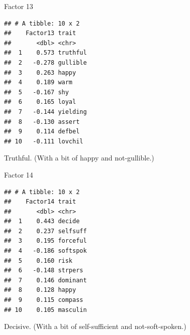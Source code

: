 \documentclass[
  ignorenonframetext,
]{beamer}
\newenvironment{Shaded}{\begin{snugshade}}{\end{snugshade}}
\newcommand{\DecValTok}[1]{\textcolor[rgb]{0.00,0.00,0.81}{#1}}
\newcommand{\KeywordTok}[1]{\textcolor[rgb]{0.13,0.29,0.53}{\textbf{#1}}}
\newcommand{\NormalTok}[1]{#1}
\newcommand{\OperatorTok}[1]{\textcolor[rgb]{0.81,0.36,0.00}{\textbf{#1}}}
\newcommand{\StringTok}[1]{\textcolor[rgb]{0.31,0.60,0.02}{#1}}
\begin{document}
\begin{frame}[fragile]{Factor 13}
\protect\hypertarget{factor-13}{}

\footnotesize

\begin{Shaded}
\end{Shaded}

\begin{verbatim}
## # A tibble: 10 x 2
##    Factor13 trait   
##       <dbl> <chr>   
##  1    0.573 truthful
##  2   -0.278 gullible
##  3    0.263 happy   
##  4    0.189 warm    
##  5   -0.167 shy     
##  6    0.165 loyal   
##  7   -0.144 yielding
##  8   -0.130 assert  
##  9    0.114 defbel  
## 10   -0.111 lovchil
\end{verbatim}

\normalsize

Truthful. (With a bit of happy and not-gullible.)

\end{frame}

\begin{frame}[fragile]{Factor 14}
\protect\hypertarget{factor-14}{}

\footnotesize

\begin{Shaded}
\end{Shaded}

\begin{verbatim}
## # A tibble: 10 x 2
##    Factor14 trait   
##       <dbl> <chr>   
##  1    0.443 decide  
##  2    0.237 selfsuff
##  3    0.195 forceful
##  4   -0.186 softspok
##  5    0.160 risk    
##  6   -0.148 strpers 
##  7    0.146 dominant
##  8    0.128 happy   
##  9    0.115 compass 
## 10    0.105 masculin
\end{verbatim}

\normalsize

Decisive. (With a bit of self-sufficient and not-soft-spoken.)

\end{frame}
\end{document}
